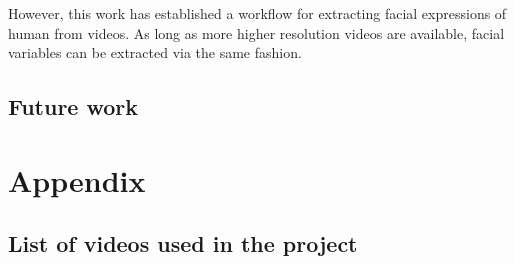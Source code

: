 \documentclass{monashthesis}
\begin{document}
However, this work has established a workflow for extracting facial expressions of human from videos. As long as more higher resolution videos are available, facial variables can be extracted via the same fashion.

\hypertarget{future-work}{%
\section{Future work}\label{future-work}}

\appendix

\hypertarget{appendix}{%
\chapter{Appendix}\label{appendix}}

\hypertarget{list-of-videos-used-in-the-project}{%
\section{List of videos used in the project}\label{list-of-videos-used-in-the-project}}
\end{document}
